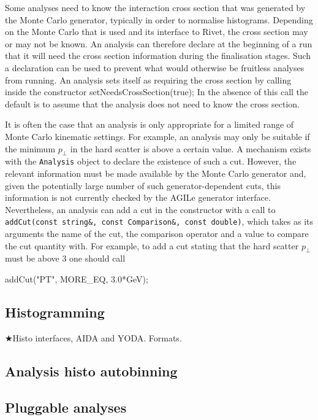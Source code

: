 \documentclass{JHEP3}
\DeclareRobustCommand{\TODO}[1]{\ensuremath{\bigstar}{#1}\xspace}
\newenvironment{snippet}{\Verbatim}{\endVerbatim}
\newcommand{\code}[1]{\texttt{#1}\xspace}
\newcommand{\pT}{\ensuremath{p_\perp}\xspace}
\begin{document}
Some analyses need to know the interaction cross section that was generated by
the Monte Carlo generator, typically in order to normalise histograms.
Depending on the Monte Carlo that is used and its interface to Rivet, the cross
section may or may not be known.  An analysis can therefore declare at the
beginning of a run that it will need the cross section information during the
finalisation stages.  Such a declaration can be used to prevent what would
otherwise be fruitless analyses from running.  An analysis sets itself as
requiring the cross section by calling inside the constructor
%
\begin{snippet}
  setNeedsCrossSection(true);
\end{snippet}
%
\noindent In the absence of this call the default is to assume that the analysis
does not need to know the cross section.

It is often the case that an analysis is only appropriate for a limited range of
Monte Carlo kinematic settings.  For example, an analysis may only be suitable
if the minimum \pT in the hard scatter is above a certain value.  A mechanism
exists with the \code{Analysis} object to declare the existence of such a cut.
However, the relevant information must be made available by the Monte Carlo
generator and, given the potentially large number of such generator-dependent
cuts, this information is not currently checked by the AGILe generator
interface.  Nevertheless, an analysis can add a cut in the constructor with a
call to \code{addCut(const string\&, const Comparison\&, const double)}, which
takes as its arguments the name of the cut, the comparison operator and a value
to compare the cut quantity with.  For example, to add a cut stating that the
hard scatter \pT must be above \unit{3}{\GeV} one should call

\begin{snippet}
  addCut("PT", MORE_EQ, 3.0*GeV);
\end{snippet}



\subsection{Histogramming}
\TODO{Histo interfaces, AIDA and YODA. Formats.}

\subsection{Analysis histo autobinning}
\subsection{Pluggable analyses}
\end{document}
